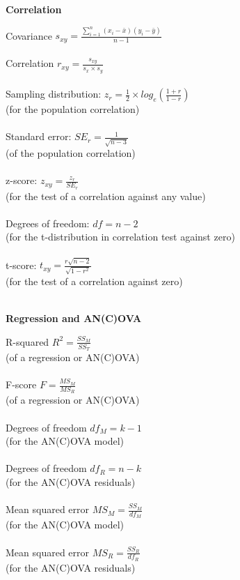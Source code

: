 \clearpage %

\begin{minipage}[t]{.45\textwidth}
\begin{center}
    \textbf{Correlation}
\end{center}
\hline
\answerskip
Covariance \hfill $s_{xy} = \frac{\sum^n_{i = 1} (x_i - \bar{x})(y_i - \bar{y})}{n - 1}$\\
\\
Correlation \hfill $r_{xy} = \frac{s_{xy}}{s_x \times s_y}$ \\
\\
Sampling distribution: \hfill $z_r = \frac{1}{2} \times log_e (\frac{1 + r}{1 - r})$\\
{\scriptsize (for the population correlation)} \\
\\
Standard error: \hfill $SE_r = \frac{1}{\sqrt{n - 3}}$\\
{\scriptsize (of the population correlation)} \\
\\
z-score: \hfill $z_{xy} = \frac{z_r}{SE_r}$\\
{\scriptsize (for the test of a correlation against any value)} \\
\\
Degrees of freedom: \hfill $df = n - 2$\\
{\scriptsize (for the t-distribution in correlation test against zero)} \\
\\
t-score: \hfill $t_{xy} = \frac{r \sqrt{n - 2}}{\sqrt{1 - r^2}}$\\
{\scriptsize (for the test of a correlation against zero)} \\
\\
\begin{center}
    \textbf{Regression and AN(C)OVA}
\end{center}
\hline
\answerskip
R-squared \hfill $R^2 = \frac{SS_M}{SS_T}$ \\
{\scriptsize (of a regression or AN(C)OVA)} \\
\\
F-score \hfill $F = \frac{MS_M}{MS_R}$ \\
{\scriptsize (of a regression or AN(C)OVA)} \\
\\
Degrees of freedom \hfill $df_M = k - 1$ \\
{\scriptsize (for the AN(C)OVA model)} \\
\\
Degrees of freedom \hfill $df_R = n - k$ \\
{\scriptsize (for the AN(C)OVA residuals)} \\
\\
Mean squared error \hfill $MS_M = \frac{SS_M}{df_M}$ \\
{\scriptsize (for the AN(C)OVA model)} \\
\\
Mean squared error \hfill $MS_R = \frac{SS_R}{df_R}$ \\
{\scriptsize (for the AN(C)OVA residuals)} \\
\\
\end{minipage}
